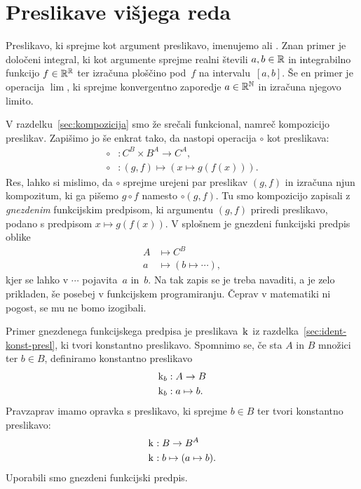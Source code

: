 \section{Preslikave višjega reda}
\label{sec:presl-visj-red}

Preslikavo, ki sprejme kot argument preslikavo, imenujemo  ali . Znan primer je določeni integral, ki kot argumente sprejme realni števili $a, b\in \mathbb{R}$ in integrabilno funkcijo $f \in \mathbb{R}^{\mathbb{R}}$ ter izračuna ploščino pod~$f$ na intervalu~$[a,b]$.
Še en primer je operacija $\lim$, ki sprejme konvergentno zaporedje $a \in \mathbb{R}^{\mathbb{N}}$ in izračuna njegovo limito.

V razdelku~\ref{sec:kompozicija} smo že srečali funkcional, namreč kompozicijo preslikav. Zapišimo jo še enkrat tako, da nastopi operacija $\circ$ kot preslikava:
%
\begin{align*}
  {\circ} &: C^B \times B^A \to C^A, \\
  {\circ} &: (g, f) \mapsto (x \mapsto g(f(x))).
\end{align*}
%
Res, lahko si mislimo, da $\circ$ sprejme urejeni par preslikav $(g, f)$ in izračuna njun kompozitum, ki ga pišemo $g \circ f$ namesto ${\circ}(g, f)$.
%
Tu smo kompozicijo zapisali z \emph{gnezdenim} funkcijskim predpisom, ki argumentu $(g, f)$ priredi
preslikavo, podano s predpisom $x \mapsto g(f(x))$. V splošnem je gnezdeni funkcijski
predpis oblike
%
\begin{align*}
  A &\mapsto C^B \\
  a &\mapsto (b \mapsto \cdots),
\end{align*}
%
kjer se lahko v $\cdots$ pojavita~$a$ in~$b$. Na tak zapis se je treba navaditi, a je zelo
prikladen, še posebej v funkcijskem programiranju. Čeprav v matematiki ni pogost, se mu ne bomo izogibali.

Primer gnezdenega funkcijskega predpisa je preslikava~$\mathrm{k}_{}$ iz razdelka~\ref{sec:ident-konst-presl}, ki tvori konstantno preslikavo. Spomnimo se, če sta $A$ in $B$ množici ter $b \in B$, definiramo konstantno preslikavo
%
\begin{align*}
  \mathrm{k}_{b} &: A \to B \\
  \mathrm{k}_{b} &: a \mapsto b.
\end{align*}
%
Pravzaprav imamo opravka s preslikavo, ki sprejme $b \in B$ ter tvori konstantno preslikavo:
%
\begin{align*}
  \mathrm{k}_{} &: B \to B^A \\
  \mathrm{k}_{} &: b \mapsto (a \mapsto b).
\end{align*}
%
Uporabili smo gnezdeni funkcijski predpis.

